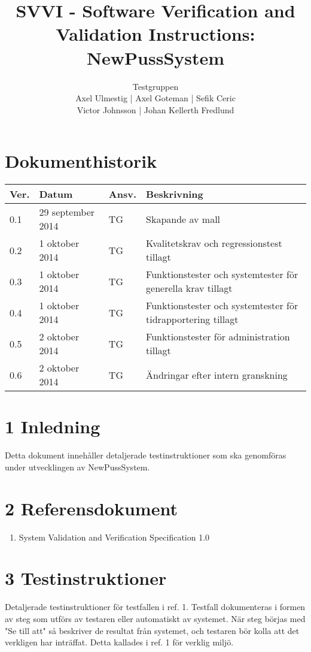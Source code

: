 \documentclass[a4paper]{article}
\title{SVVI - Software Verification and Validation Instructions: NewPussSystem}
\author{Testgruppen \\ Axel Ulmestig | Axel Goteman | Sefik Ceric \\ Victor Johnsson | Johan Kellerth Fredlund}
\date{}
\begin{document}
\maketitle
\thispagestyle{fancy}
\tableofcontents
\newpage

\section*{Dokumenthistorik}

\begin{tabular}{ l l l p{9cm} }
Ver. & Datum & Ansv. & Beskrivning \\\hline
0.1 & 29 september 2014 & TG & Skapande av mall \\
0.2 & 1 oktober 2014 & TG & Kvalitetskrav och regressionstest tillagt \\
0.3 & 1 oktober 2014 & TG & Funktionstester och systemtester för generella krav tillagt\\
0.4 & 1 oktober 2014 & TG & Funktionstester och systemtester för tidrapportering tillagt\\
0.5 & 2 oktober 2014 & TG & Funktionstester för administration tillagt\\
0.6 & 2 oktober 2014 & TG & Ändringar efter intern granskning\\

\end{tabular}
\section{1 Inledning}       

Detta dokument innehåller detaljerade testinstruktioner som ska genomföras under utvecklingen av NewPussSystem.

\section{2 Referensdokument}
\begin{enumerate}
\item System Validation and Verification Specification 1.0
\end{enumerate}



\section{3 Testinstruktioner}
Detaljerade testinstruktioner för testfallen i ref. 1. Testfall dokumenteras i formen av steg som utförs av testaren eller automatiskt av systemet. När steg börjas med "Se till att" så beskriver de resultat från systemet, och testaren bör kolla att det verkligen har inträffat. Detta kallades i ref. 1 för verklig miljö.
\end{document}
